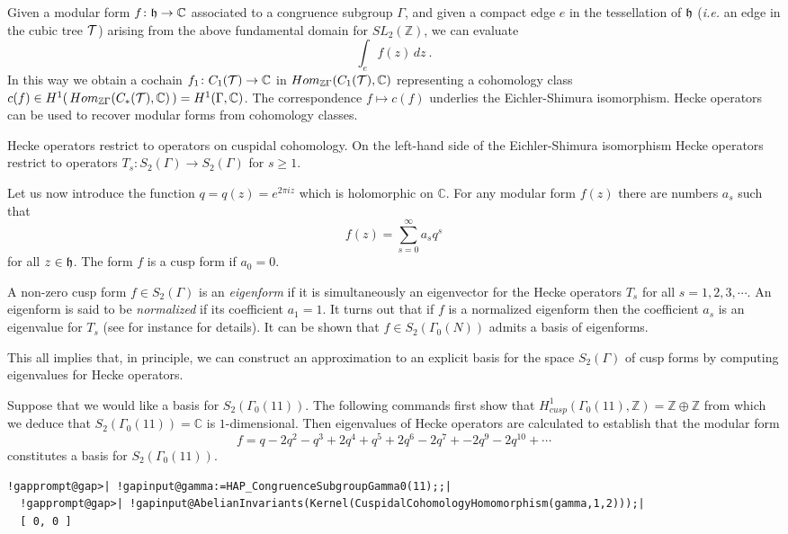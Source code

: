 \documentclass[a4paper,11pt]{report}
\begin{document}
{{Given a modular form $f\colon {\frak h} \rightarrow \mathbb C$ associated to a congruence subgroup $\Gamma$, and given a compact edge $e$ in the tessellation of ${\frak h}$ (\emph{i.e.} an edge in the cubic tree $\cal T$) arising from the above fundamental domain for $SL_2(\mathbb Z)$, we can evaluate 
\[\int_e f(z)\,dz \ .\]
 In this way we obtain a cochain $f_1\colon C_1({\cal T}) \rightarrow \mathbb C$ in $Hom_{\mathbb Z\Gamma}(C_1({\cal T}), \mathbb C)$ representing a cohomology class $c(f) \in H^1(\, Hom_{\mathbb Z\Gamma}(C_\ast({\cal T}), \mathbb C) \,) =
H^1(\Gamma,\mathbb C)$. The correspondence $f\mapsto c(f)$ underlies the Eichler-Shimura isomorphism. Hecke operators can be used to
recover modular forms from cohomology classes. 

Hecke operators restrict to operators on cuspidal cohomology. On the left-hand
side of the Eichler-Shimura isomorphism Hecke operators restrict to operators $T_s\colon S_2(\Gamma) \rightarrow S_2(\Gamma)$ for $s\ge 1$. 

Let us now introduce the function $q=q(z)=e^{2\pi i z}$ which is holomorphic on $\mathbb C$. For any modular form $f(z)$ there are numbers $a_s$ such that 
\[f(z) = \sum_{s=0}^\infty a_sq^s \]
 for all $z\in {\frak h}$. The form $f$ is a cusp form if $a_0=0$. 

 A non-zero cusp form $f\in S_2(\Gamma)$ is an \emph{eigenform} if it is simultaneously an eigenvector for the Hecke operators $T_s$ for all $s =1,2,3,\cdots$. An eigenform is said to be \emph{normalized} if its coefficient $a_1=1$. It turns out that if $f$ is a normalized eigenform then the coefficient $a_s$ is an eigenvalue for $T_s$ (see for instance \cite{stein} for details). It can be shown \cite{atkinlehner} that $f\in S_2(\Gamma_0(N))$ admits a basis of eigenforms. 

 This all implies that, in principle, we can construct an approximation to an
explicit basis for the space $S_2(\Gamma)$ of cusp forms by computing eigenvalues for Hecke operators. 

 Suppose that we would like a basis for $S_2(\Gamma_0(11))$. The following commands first show that $H^1_{cusp}(\Gamma_0(11),\mathbb Z)=\mathbb Z\oplus \mathbb Z$ from which we deduce that $S_2(\Gamma_0(11)) =\mathbb C$ is $1$-dimensional. Then eigenvalues of Hecke operators are calculated to establish
that the modular form 
\[f = q -2q^2 -q^3 +2q^4 +q^5 +2q^6 -2q^7 + -2q^9 -2q^{10} + \cdots \]
 constitutes a basis for $S_2(\Gamma_0(11))$. 
\begin{Verbatim}[commandchars=!@|,fontsize=\small,frame=single,label=Example]
  !gapprompt@gap>| !gapinput@gamma:=HAP_CongruenceSubgroupGamma0(11);;|
  !gapprompt@gap>| !gapinput@AbelianInvariants(Kernel(CuspidalCohomologyHomomorphism(gamma,1,2)));|
  [ 0, 0 ]
  

\end{Verbatim}}}
\end{document}
